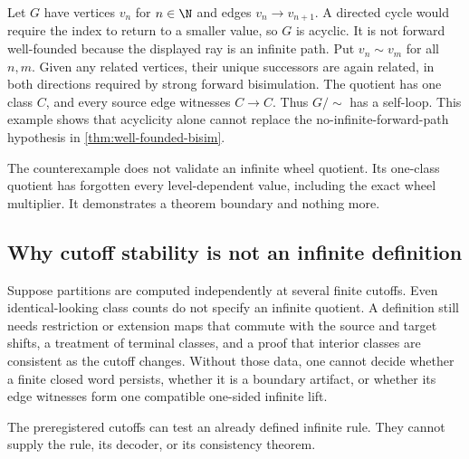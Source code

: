 Let $G$ have vertices $v_n$ for $n\in\N$ and edges
$v_n\to v_{n+1}$.  A directed cycle would require the index to return to a
smaller value, so $G$ is acyclic.  It is not forward well-founded because the
displayed ray is an infinite path.  Put $v_n\sim v_m$ for all $n,m$.  Given
any related vertices, their unique successors are again related, in both
directions required by strong forward bisimulation.  The quotient has one
class $C$, and every source edge witnesses $C\to C$.  Thus $G/{\sim}$ has a
self-loop.  This example shows that acyclicity alone cannot replace the
no-infinite-forward-path hypothesis in \cref{thm:well-founded-bisim}.

The counterexample does not validate an infinite wheel quotient.  Its
one-class quotient has forgotten every level-dependent value, including the
exact wheel multiplier.  It demonstrates a theorem boundary and nothing
more.

\subsection{Why cutoff stability is not an infinite definition}

Suppose partitions are computed independently at several finite cutoffs.
Even identical-looking class counts do not specify an infinite quotient.  A
definition still needs restriction or extension maps that commute with the
source and target shifts, a treatment of terminal classes, and a proof that
interior classes are consistent as the cutoff changes.  Without those data,
one cannot decide whether a finite closed word persists, whether it is a
boundary artifact, or whether its edge witnesses form one compatible
one-sided infinite lift.

The preregistered cutoffs can test an already defined infinite rule.  They
cannot supply the rule, its decoder, or its consistency theorem.
